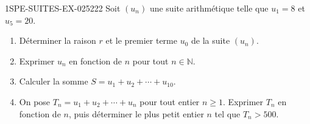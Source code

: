 \begin{exercice}{1SPE-SUITES-EX-025}{2}{22}
Soit $(u_n)$ une suite arithmétique telle que $u_1 = 8$ et $u_5 = 20$.

\begin{enumerate}
  \item Déterminer la raison $r$ et le premier terme $u_0$ de la suite $(u_n)$.

  \item Exprimer $u_n$ en fonction de $n$ pour tout $n \in \mathbb{N}$.

  \item Calculer la somme $S = u_1 + u_2 + \cdots + u_{10}$.

  \item On pose $T_n = u_1 + u_2 + \cdots + u_n$ pour tout entier $n \geq 1$. Exprimer $T_n$ en fonction de $n$, puis déterminer le plus petit entier $n$ tel que $T_n > 500$.
\end{enumerate}
\end{exercice}
